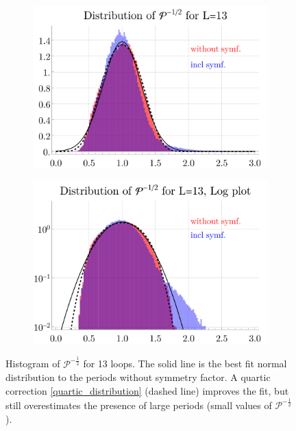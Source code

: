 \documentclass[11pt,a4paper]{article}
\newcommand{\period}{\mathcal P}
\renewcommand{\|}{\rule[-0.4ex]{0.2ex}{1.2em}}
\begin{document}
\begin{figure}[htbp]
	\begin{subfigure}[b]{.48 \textwidth}
		\includegraphics[width=\linewidth]{distribution_sqrt13}
		\subcaption{}
		
	\end{subfigure}
	\begin{subfigure}[b]{.48 \textwidth}
		\includegraphics[width=\linewidth]{distribution_sqrt13_log}
		\subcaption{}
		\label{fig:histogram_sqrt_log}
	\end{subfigure}
	
	\caption{Histogram of $\period^{-\frac 12}$ for 13 loops. The solid line is the best fit normal distribution to the periods without symmetry factor.  A quartic correction \cref{quartic_distribution} (dashed line) improves the fit, but still overestimates the presence of large periods (small values of $\period^{-\frac 12}$). }
	\label{fig:histogram_sqrt}
\end{figure}
\end{document}
